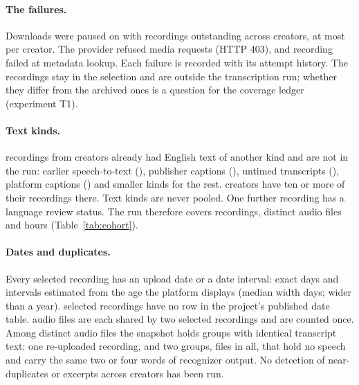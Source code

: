 \documentclass[letterpaper]{article} %
\newcommand{\expid}[1]{\textsc{#1}}
\begin{document}
\paragraph{The \NFailed{} failures.} Downloads were paused on \PauseStamp{} with \NFailed{} recordings outstanding across \NFailedCreators{} creators, at most \FailedMaxPerCreator{} per creator. The provider refused \NFailedForbidden{} media requests (HTTP 403), and \NFailedMetadata{} recording failed at metadata lookup. Each failure is recorded with its attempt history. The \NFailed{} recordings stay in the selection and are outside the transcription run; whether they differ from the archived ones is a question for the coverage ledger (experiment \expid{T1}).

\paragraph{Text kinds.} \NOtherText{} recordings from \NOtherTextCreators{} creators already had English text of another kind and are not in the run: earlier speech-to-text (\NOtherTextEarlierAsr), publisher captions (\NOtherTextPublisherCaptions), untimed transcripts (\NOtherTextUntimed), platform captions (\NOtherTextPlatformCaptions) and smaller kinds for the rest. \NCreatorsHalfOtherText{} creators have ten or more of their recordings there. Text kinds are never pooled. One further recording has a language review status. The run therefore covers \NRunRecordings{} recordings, \NRunAudio{} distinct audio files and \RunHours{} hours (Table~\ref{tab:cohort}).

\paragraph{Dates and duplicates.} Every selected recording has an upload date or a date interval: \NExactDates{} exact days and \NEstimatedDates{} intervals estimated from the age the platform displays (median width \EstimatedDateMedianWidth{} days; \NEstimatedOverYear{} wider than a year). \NNoDateRow{} selected recordings have no row in the project's published date table. \NSharedAudio{} audio files are each shared by two selected recordings and are counted once. Among distinct audio files the snapshot holds \NIdenticalTextGroups{} groups with identical transcript text: one re-uploaded recording, and two groups, \NFillerOnlyFiles{} files in all, that hold no speech and carry the same two or four words of recognizer output. No detection of near-duplicates or excerpts across creators has been run.
\end{document}

